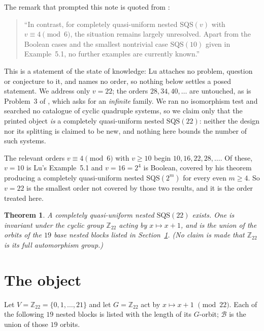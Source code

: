 \documentclass[11pt]{amsart}
\newtheorem{theorem}{Theorem}
\theoremstyle{remark}
\newcommand{\SQS}{\mathrm{SQS}}
\newcommand{\Zn}[1]{\mathbb{Z}_{#1}}
\begin{document}
The remark that prompted this note is quoted from \cite{Lu}:

\begin{quote}
``In contrast, for completely quasi-uniform nested $\SQS(v)$ with
$v\equiv4\pmod6$, the situation remains largely unresolved. Apart from the
Boolean cases and the smallest nontrivial case $\SQS(10)$ given in Example~5.1,
no further examples are currently known.''
\end{quote}

This is a statement of the state of knowledge: Lu attaches no problem, question
or conjecture to it, and names no order, so nothing below settles a posed
statement. We address only $v=22$; the orders $28,34,40,\dots$ are untouched, as
is Problem~3 of \cite{CDEKZ}, which asks for an \emph{infinite} family. We ran
no isomorphism test and searched no catalogue of cyclic quadruple systems, so we
claim only that the printed object \emph{is} a completely quasi-uniform nested
$\SQS(22)$: neither the design nor its splitting is claimed to be new, and
nothing here bounds the number of such systems.

The relevant orders $v\equiv4\pmod6$ with $v\ge10$ begin $10,16,22,28,\dots$. Of these, $v=10$ is Lu's Example~5.1 and
$v=16=2^4$ is Boolean, covered by his theorem producing a completely
quasi-uniform nested $\SQS(2^m)$ for every even $m\ge4$. So $v=22$ is the
smallest order not covered by those two results, and it is the order treated
here.

\begin{theorem}\label{thm:main}
A completely quasi-uniform nested $\SQS(22)$ exists. One is invariant under the
cyclic group $\Zn{22}$ acting by $x\mapsto x+1$, and is the union of the
orbits of the $19$ base nested blocks listed in
Section~\textup{\ref{sec:object}}. \textup{(}No claim is made that $\Zn{22}$ is
its full automorphism group.\textup{)}
\end{theorem}



\section{The object}\label{sec:object}

Let $V=\Zn{22}=\{0,1,\dots,21\}$ and let $G=\Zn{22}$ act by $x\mapsto x+1$
$\pmod{22}$. Each of the following $19$ nested blocks is listed with the length
of its $G$-orbit; $\mathcal B$ is the union of those $19$ orbits.
\end{document}
